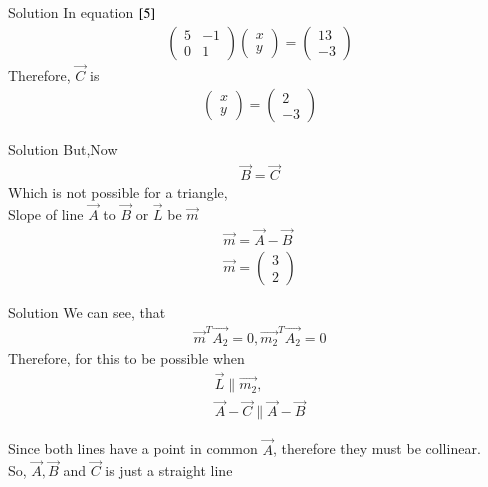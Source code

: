 \documentclass{beamer}
\begin{document}
\begin{frame}{Solution}
In equation $\eqref{5}$ 
\begin{align}
    \begin{pmatrix}5 & -1\\ 0 & 1\end{pmatrix}\begin{pmatrix}x\\ y\end{pmatrix}=\begin{pmatrix}13\\ -3\end{pmatrix}
\end{align}
Therefore, $\vec{C}$ is
\begin{align}
    \begin{pmatrix}x\\y\end{pmatrix} = \begin{pmatrix}2\\-3\end{pmatrix}
\end{align}
\end{frame}
\begin{frame}{Solution}
But,Now
\begin{align}
    \vec{B}=\vec{C}
\end{align}
Which is not possible for a triangle,\\
Slope of line $\vec{A}$ to $\vec{B}$ or $\vec{L}$ be $\vec{m}$
\begin{align}
\vec{m}=\vec{A}-\vec{B}\\
\vec{m}=\begin{pmatrix}3\\2\end{pmatrix}
\end{align}
\end{frame}
\begin{frame}{Solution}
We can see, that
\begin{align}
    \vec{m}^T\vec{A_2}=0,\vec{m_2}^T\vec{A_2}=0
\end{align}
Therefore, for this to be possible when
\begin{align}
    \vec{L} \parallel \vec{m_2}, \\ \vec{A}-\vec{C} \parallel \vec{A}-\vec{B}
\end{align}

Since both lines have a point in common $\vec{A}$, therefore they must be collinear.\\
So, $\vec{A},\vec{B}$ and $\vec{C}$ is just a straight line
\end{frame}
\end{document}
